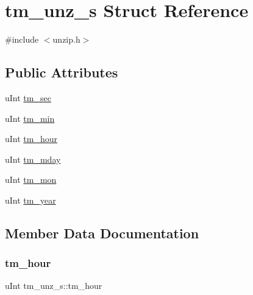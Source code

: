 \hypertarget{structtm__unz__s}{}\section{tm\+\_\+unz\+\_\+s Struct Reference}
\label{structtm__unz__s}


{\ttfamily \#include $<$unzip.\+h$>$}

\subsection*{Public Attributes}
\begin{DoxyCompactItemize}
\item 
u\+Int \hyperlink{structtm__unz__s_ab91e69a9869e5db5be51b1aebaa5ea0d}{tm\+\_\+sec}
\item 
u\+Int \hyperlink{structtm__unz__s_ac5a6bf08a4c5db8ae2243d4f0c35b192}{tm\+\_\+min}
\item 
u\+Int \hyperlink{structtm__unz__s_ada09255f794d6c2db07ef73b77266b9c}{tm\+\_\+hour}
\item 
u\+Int \hyperlink{structtm__unz__s_a51ed1873e1dcabf08ff0f85caf8aefee}{tm\+\_\+mday}
\item 
u\+Int \hyperlink{structtm__unz__s_a4f5e461d8cad18d1aff7ec012168111d}{tm\+\_\+mon}
\item 
u\+Int \hyperlink{structtm__unz__s_a5f17147e3cfbbfdbeb2e29cbc1df8136}{tm\+\_\+year}
\end{DoxyCompactItemize}


\subsection{Member Data Documentation}
\mbox{\label{structtm__unz__s_ada09255f794d6c2db07ef73b77266b9c}} 
\subsubsection{\texorpdfstring{tm\+\_\+hour}{tm\_hour}}
{\footnotesize\ttfamily u\+Int tm\+\_\+unz\+\_\+s\+::tm\+\_\+hour}

\mbox{\label{structtm__unz__s_a51ed1873e1dcabf08ff0f85caf8aefee}} 

